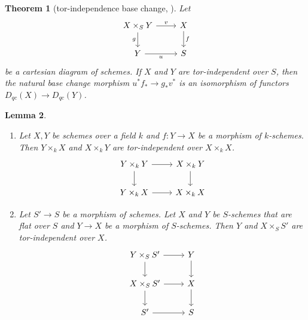 \documentclass[12pt]{amsart}
\numberwithin{equation}{section}
\theoremstyle{plain}
\newtheorem{theorem}{Theorem}[section]
\newtheorem{lemma}[theorem]{Lemma}
\theoremstyle{definition}
\begin{document}
\begin{theorem}[tor-independence base change, {\cite[\href{https://stacks.math.columbia.edu/tag/08IB}{Tag 08IB}]{stacks-project}}]
    Let
    \[
        \begin{tikzcd}
            X \times_S Y \arrow[r,"v"]\arrow[d, "g"'] & X \arrow[d,"f"]\\
            Y \arrow[r, "u"']& S
        \end{tikzcd}
    \]
    be a cartesian diagram of schemes.
    If $X$ and $Y$ are tor-independent over $S$, then the natural base change morphism $u^*f_* \to g_*v^*$ is an isomorphism of functors $D_{qc}(X) \to D_{qc}(Y)$.
\end{theorem}

\begin{lemma}
    \begin{enumerate}\label{lem:tor-independent-situations}
        \item Let $X, Y$ be schemes over a field $k$ and $f \colon Y \to X$ be a morphism of $k$-schemes. Then $Y \times_k X$ and $X \times_k Y$ are tor-independent over $X \times_k X$.
              \[
                  \begin{tikzcd}
                      Y \times_k Y \arrow[r]\arrow[d] & X \times_k Y \arrow[d]\\
                      Y \times_k X \arrow[r]&  X \times_k X
                  \end{tikzcd}
              \]

        \item Let $S' \to S$ be a morphism of schemes. Let $X$ and $Y$ be $S$-schemes that are flat over $S$ and $Y \to X$ be a morphism of $S$-schemes. Then $Y$ and $X \times_S S'$ are tor-independent over $X$.
              \[
                  \begin{tikzcd}
                      Y \times_S S' \arrow[r]\arrow[d] & Y \arrow[d]\\
                      X \times_S S' \arrow[r]\arrow[d] & X \arrow[d]\\
                      S' \arrow[r]& S
                  \end{tikzcd}
              \]
    \end{enumerate}
\end{lemma}
\end{document}
